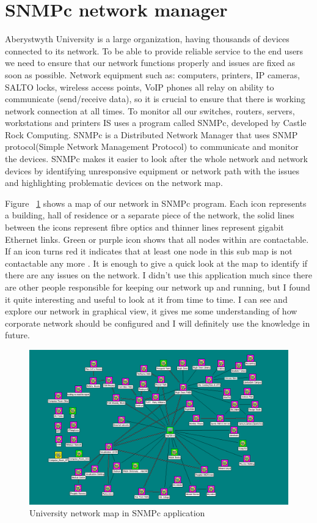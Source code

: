 \documentclass[10pt,a4paper,headinclude=true]{report}
\begin{document}
\section{SNMPc network manager}
Aberystwyth University is a large organization, having thousands of devices connected to its network. To be able to provide reliable service to the end users we need to ensure that our network functions properly and issues are fixed as soon as possible. Network equipment such as: computers, printers, IP cameras, SALTO locks, wireless access points, VoIP phones all relay on ability to communicate (send/receive data), so it is crucial to ensure that there is working network connection at all times.  To monitor all our switches, routers, servers, workstations and printers IS uses a program called SNMPc, developed by Castle Rock Computing. SNMPc is a Distributed Network Manager \cite{SNMPc} that uses SNMP protocol(Simple Network Management Protocol) to communicate and monitor the devices. SNMPc makes it easier to look after the whole network and network devices by identifying unresponsive equipment or network path with the issues and highlighting problematic devices on the network map. 

Figure ~\ref{fig:SNMPc_main} shows a map of our network in SNMPc program. Each icon represents a building, hall of residence or a separate piece of the network, the solid lines between the icons represent fibre optics and thinner lines represent gigabit Ethernet links. Green or purple icon shows that all nodes within are contactable. If an icon turns red it indicates that at least one node in this sub map is not contactable any more \cite{SNPMcSharePoint}. It is enough to give a quick look at the map to identify if there are any issues on the network. I didn't use this application much since there are other people responsible for keeping our network up and running, but I found it quite interesting and useful to look at it from time to time. I can see and explore our network in graphical view, it gives me some understanding of how corporate network should be configured and I will definitely use the knowledge in future.

\begin{figure}[H]
\centering
\centerline{\includegraphics[scale=0.5]{./SNMPc_main}}
\caption{University network map in SNMPc application}
\label{fig:SNMPc_main}
\end{figure}
\end{document}
